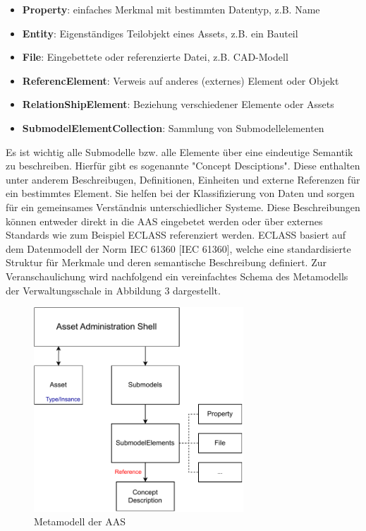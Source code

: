 \begin{itemize}
    \item \textbf{Property}: einfaches Merkmal mit bestimmten Datentyp, z.B. Name
    \item \textbf{Entity}: Eigenständiges Teilobjekt eines Assets, z.B. ein Bauteil 
    \item \textbf{File}: Eingebettete oder referenzierte Datei, z.B. CAD-Modell
    \item \textbf{ReferencElement}: Verweis auf anderes (externes) Element oder Objekt
    \item \textbf{RelationShipElement}: Beziehung verschiedener Elemente oder Assets
    \item \textbf{SubmodelElementCollection}: Sammlung von Submodellelementen
\end{itemize}

Es ist wichtig alle Submodelle bzw. alle Elemente über eine eindeutige Semantik zu beschreiben.
Hierfür gibt es sogenannte "Concept Desciptions". Diese enthalten unter anderem Beschreibugen, Definitionen, Einheiten und externe Referenzen für ein bestimmtes Element.
Sie helfen bei der Klassifizierung von Daten und sorgen für ein gemeinsames Verständnis unterschiedlicher Systeme.
Diese Beschreibungen können entweder direkt in die AAS eingebetet werden oder über externes Standards wie zum Beispiel ECLASS referenziert werden.
ECLASS basiert auf dem Datenmodell der Norm IEC 61360 [IEC 61360], welche eine standardisierte Struktur für Merkmale und deren semantische Beschreibung definiert.
Zur Veranschaulichung wird nachfolgend ein vereinfachtes Schema des Metamodells der Verwaltungsschale in Abbildung 3 dargestellt. \cite{SpezifikationPart1}

\begin{figure}[htbp]
    \centering
    \includegraphics[width=0.7\textwidth]{Bilder/Metamodel.pdf}
    \caption{Metamodell der AAS}
    \label{fig:MetamodellAAS}
\end{figure}


